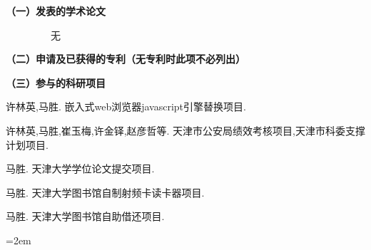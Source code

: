 
\begin{reseachlog}
\setlength{\parindent}{0em}
\textbf{（一）发表的学术论文}

~~~~~~~~~无

\textbf{（二）申请及已获得的专利（无专利时此项不必列出）}

\textbf{（三）参与的科研项目}
\begin{enumerate}[{[}1{]}]
\item   许林英,马胜. 嵌入式web浏览器javascript引擎替换项目.
\item   许林英,马胜,崔玉梅,许金铎,赵彦哲等. 天津市公安局绩效考核项目,天津市科委支撑计划项目.
\item   马胜. 天津大学学位论文提交项目.
\item   马胜. 天津大学图书馆自制射频卡读卡器项目.
\item   马胜. 天津大学图书馆自助借还项目.
\end{enumerate}
\vfill
{}\hangindent=2em\noindent

\setlength{\parindent}{2em}
\end{reseachlog}
